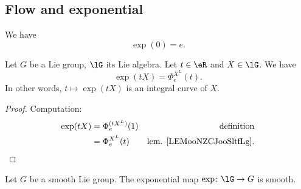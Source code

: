 \subsection{Flow and exponential}

\begin{lemma}       \label{LEMooEQFHooRjUAin}
	We have
	\begin{equation}
		\exp(0)=e.
	\end{equation}
\end{lemma}


\begin{lemma}        \label{LEMooGKDKooFTsDSr}
	Let \( G\) be a Lie group, \( \lG\) its Lie algebra. Let \( t\in \eR\) and \( X\in\lG\). We have
	\begin{equation}
		\exp(tX)=\Phi_e^{X^L}(t).
	\end{equation}
	In other words, \( t\mapsto \exp(tX)\) is an integral curve of \( X\).
\end{lemma}

\begin{proof}
	Computation:
	\begin{subequations}
		\begin{align}
			\exp(tX) & =\Phi_e^{(tX^L)}(1) & \text{definition}                    \\
			         & =\Phi_e^{X^L}(t)    & \text{lem. \ref{LEMooNZCJooSltfLg}}.
		\end{align}
	\end{subequations}
\end{proof}

\begin{proposition}       \label{PROPooMIMZooAwxvkB}
	Let \( G\) be a smooth Lie group. The exponential map \( \exp\colon \lG\to G\) is smooth.
\end{proposition}

